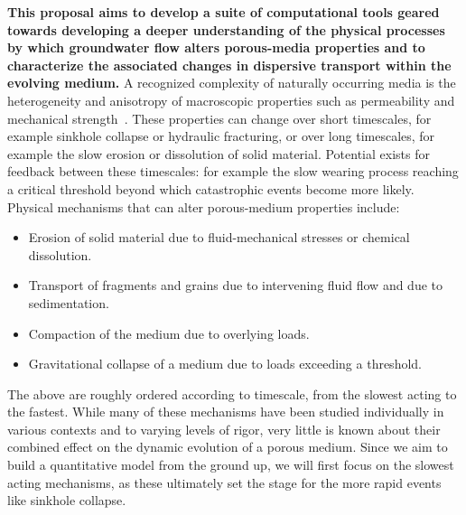\documentclass[11pt]{article}
\begin{document}
{\bf This proposal aims to develop a suite of computational tools geared towards developing a deeper understanding of the physical processes by which groundwater flow alters porous-media properties and to characterize the associated changes in dispersive transport within the evolving medium.} A recognized complexity of naturally occurring media is the heterogeneity and anisotropy of macroscopic properties such as permeability and mechanical strength~\cite{neuman1987stochastic, moyner2016multiscale, lin2018randomization}. These properties can change over short timescales, for example sinkhole collapse or hydraulic fracturing, or over long timescales, for example the slow erosion or dissolution of solid material. Potential exists for feedback between these timescales: for example the slow wearing process reaching a critical threshold beyond which catastrophic events become more likely.  Physical mechanisms that can alter porous-medium properties include: 
\begin{itemize}[noitemsep,topsep=0pt]
\item Erosion of solid material due to fluid-mechanical stresses or chemical dissolution.
\item Transport of fragments and grains due to intervening fluid flow and due to sedimentation.
\item Compaction of the medium due to overlying loads.
\item Gravitational collapse of a medium due to loads exceeding a threshold.
\end{itemize}
The above are roughly ordered according to timescale, from the slowest acting to the fastest. While many of these mechanisms have been studied individually in various contexts and to varying levels of rigor, very little is known about their combined effect on the dynamic evolution of a porous medium. Since we aim to build a quantitative model from the ground up, we will first focus on the slowest acting mechanisms, as these ultimately set the stage for the more rapid events like sinkhole collapse. 
\end{document}
